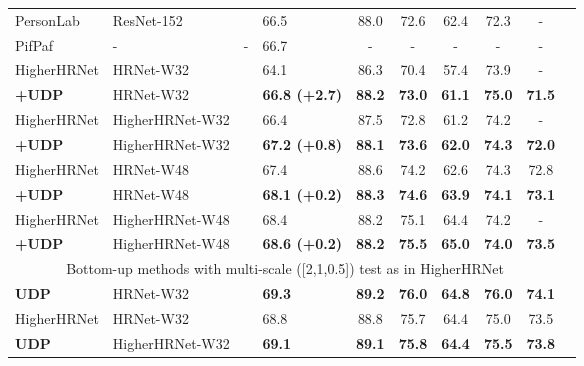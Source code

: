 \documentclass[10pt,journal,compsoc]{IEEEtran}
\begin{document}
\begin{table*}
\begin{center}
\begin{tabular}{l|l|c|lcccccc}
PersonLab \cite{PersonLab}         & ResNet-152    &  &66.5                  & 88.0              & 72.6         & 62.4          &72.3           &-\\
PifPaf \cite{PIFPAF}               & -             &-                 &66.7                  & -                 & -            &-              &-              &-    \\
HigherHRNet \cite{Higher}          & HRNet-W32     &    &64.1                  & 86.3              & 70.4         & 57.4          &73.9           &-\\
\textbf{+UDP}                      & HRNet-W32     &    &\textbf{66.8 (+2.7)}         & \textbf{88.2}     & \textbf{73.0}& \textbf{61.1} &\textbf{75.0}  &\textbf{71.5}\\
HigherHRNet \cite{Higher}          &HigherHRNet-W32&    &66.4                  & 87.5              & 72.8         & 61.2          &74.2           &-\\
\textbf{+UDP}                      &HigherHRNet-W32&    &\textbf{67.2 (+0.8)}         & \textbf{88.1}     & \textbf{73.6}& \textbf{62.0} &\textbf{74.3}  &\textbf{72.0}\\
HigherHRNet \cite{Higher} &HRNet-W48      &    &67.4                  & 88.6              & 74.2         & 62.6          &74.3           &72.8\\
\textbf{+UDP}                      &HRNet-W48      &    &\textbf{68.1 (+0.2)}         & \textbf{88.3}     & \textbf{74.6}& \textbf{63.9} &\textbf{74.1}  &\textbf{73.1}\\
HigherHRNet \cite{Higher}          &HigherHRNet-W48&    &68.4                  & 88.2              & 75.1         & 64.4          &74.2           &-\\
\textbf{+UDP}                      &HigherHRNet-W48&    &\textbf{68.6 (+0.2)}         & \textbf{88.2}     & \textbf{75.5}& \textbf{65.0} &\textbf{74.0}  &\textbf{73.5}\\
\hline
\multicolumn{9}{c}{Bottom-up methods with multi-scale ([2,1,0.5]) test as in HigherHRNet \cite{Higher} }\\
\hline
\textbf{UDP}                     &HRNet-W32      &    &\textbf{69.3}         & \textbf{89.2}     & \textbf{76.0}  & \textbf{64.8} &\textbf{76.0}  &\textbf{74.1}\\
HigherHRNet \cite{Higher}&HRNet-W32     &    &68.8                  & 88.8              & 75.7           & 64.4          &75.0           &73.5\\
\textbf{UDP}                     &HigherHRNet-W32&    &\textbf{69.1}         & \textbf{89.1}     & \textbf{75.8}  & \textbf{64.4} &\textbf{75.5}  &\textbf{73.8}\\

\end{tabular}
\end{center}
\end{table*}
\end{document}
